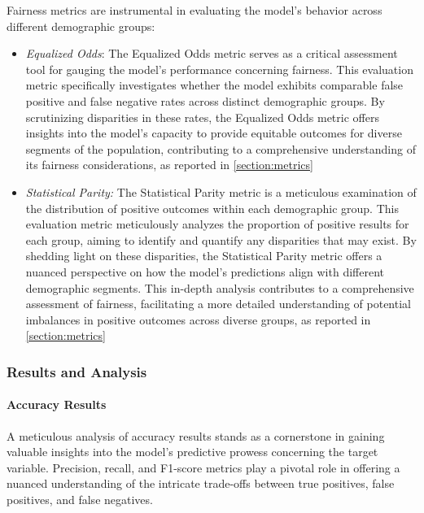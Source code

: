 Fairness metrics are instrumental in evaluating the model's behavior across different demographic groups:

\begin{itemize}
    
    \item \emph{Equalized Odds}: The Equalized Odds metric serves as a critical assessment tool for gauging the model's performance concerning fairness. This evaluation metric specifically investigates whether the model exhibits comparable false positive and false negative rates across distinct demographic groups. By scrutinizing disparities in these rates, the Equalized Odds metric offers insights into the model's capacity to provide equitable outcomes for diverse segments of the population, contributing to a comprehensive understanding of its fairness considerations, as reported in \cref{section:metrics}
    
    \item \emph{Statistical Parity:} The Statistical Parity metric is a meticulous examination of the distribution of positive outcomes within each demographic group. This evaluation metric meticulously analyzes the proportion of positive results for each group, aiming to identify and quantify any disparities that may exist. By shedding light on these disparities, the Statistical Parity metric offers a nuanced perspective on how the model's predictions align with different demographic segments. This in-depth analysis contributes to a comprehensive assessment of fairness, facilitating a more detailed understanding of potential imbalances in positive outcomes across diverse groups, as reported in \cref{section:metrics}

\end{itemize}

\subsubsection{Results and Analysis}

\paragraph{Accuracy Results}

A meticulous analysis of accuracy results stands as a cornerstone in gaining valuable insights into the model's predictive prowess concerning the target variable. Precision, recall, and F1-score metrics play a pivotal role in offering a nuanced understanding of the intricate trade-offs between true positives, false positives, and false negatives.

